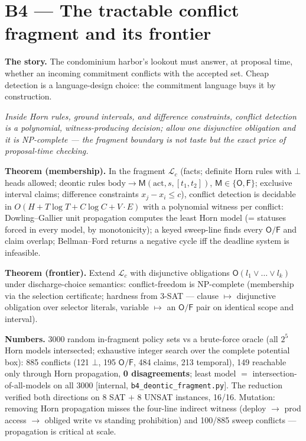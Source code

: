 \documentclass[11pt,a4paper]{article}
\newcommand{\onebreath}[1]{\begin{center}\emph{#1}\end{center}}
\newcommand{\Ob}{\mathsf{O}}
\newcommand{\Fb}{\mathsf{F}}
\begin{document}
\section{B4 --- The tractable conflict fragment and its frontier}\label{sec:b4}
\textbf{The story.} The condominium harbor's lookout must answer, at proposal time, whether an incoming commitment conflicts with the accepted set. Cheap detection is a language-design choice: the commitment language buys it by construction.

\onebreath{Inside Horn rules, ground intervals, and difference constraints, conflict detection is a polynomial, witness-producing decision; allow one disjunctive obligation and it is NP-complete --- the fragment boundary is not taste but the exact price of proposal-time checking.}

\begin{thebox}
\textbf{Theorem (membership).} In the fragment $\mathcal{L}_c$ (facts; definite Horn rules with $\bot$ heads allowed; deontic rules $\mathrm{body} \to \mathsf{M}(\mathrm{act}, s, [t_1,t_2])$, $\mathsf{M}\in\{\Ob,\Fb\}$; exclusive interval claims; difference constraints $x_j - x_i \le c$), conflict detection is decidable in $O(H + T\log T + C\log C + V\!\cdot\!E)$ with a polynomial witness per conflict: Dowling--Gallier unit propagation computes the least Horn model (= statuses forced in every model, by monotonicity); a keyed sweep-line finds every $\Ob/\Fb$ and claim overlap; Bellman--Ford returns a negative cycle iff the deadline system is infeasible.

\textbf{Theorem (frontier).} Extend $\mathcal{L}_c$ with disjunctive obligations $\Ob(l_1 \vee \dots \vee l_k)$ under discharge-choice semantics: conflict-freedom is NP-complete (membership via the selection certificate; hardness from 3-SAT --- clause $\mapsto$ disjunctive obligation over selector literals, variable $\mapsto$ an $\Ob/\Fb$ pair on identical scope and interval).
\end{thebox}

\textbf{Numbers.} 3000 random in-fragment policy sets vs a brute-force oracle (all $2^5$ Horn models intersected; exhaustive integer search over the complete potential box): 885 conflicts (121 $\bot$, 195 $\Ob/\Fb$, 484 claims, 213 temporal), 149 reachable only through Horn propagation, \textbf{0 disagreements}; least model $=$ intersection-of-all-models on all 3000 [internal, \texttt{b4\_deontic\_fragment.py}]. The reduction verified both directions on 8 SAT $+$ 8 UNSAT instances, 16/16. Mutation: removing Horn propagation misses the four-line indirect witness (deploy $\to$ prod access $\to$ obliged write vs standing prohibition) and 100/885 sweep conflicts --- propagation is critical at scale.
\end{document}
